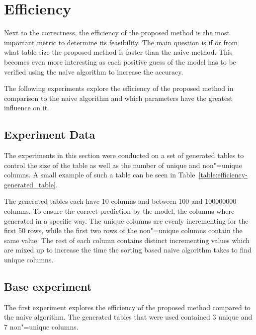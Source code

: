 \section{Efficiency}\label{sec:efficiency}
Next to the correctness, the efficiency of the proposed method is the most important metric to determine its feasibility. %
The main question is if or from what table size the proposed method is faster than the naive method. This becomes even more interesting as each positive guess of the model has to be verified using the naive algorithm to increase the accuracy. %

The following experiments explore the efficiency of the proposed method in comparison to the naive algorithm and which parameters have the greatest influence on it. %


\subsection{Experiment Data}\label{subsec:efficiency-experiment_data}
The experiments in this section were conducted on a set of generated tables to control the size of the table as well as the number of unique and non"=unique columns. A small example of such a table can be seen in Table~\ref{table:efficiency-generated_table}. %

The generated tables each have \num{10} columns and between \num{100} and \num{100000000} columns. To ensure the correct prediction by the model, the columns where generated in a specific way.
The unique columns are evenly incrementing for the first \num{50} rows, while the first two rows of the non"=unique columns contain the same value. The rest of each column contains distinct incrementing values which are mixed up to increase the time the sorting based naive algorithm takes to find unique columns. %




\subsection{Base experiment}\label{subsec:efficiency-base_experiment}
The first experiment explores the efficiency of the proposed method compared to the naive algorithm. The generated tables that were used contained \num{3} unique and \num{7} non"=unique columns.  %

